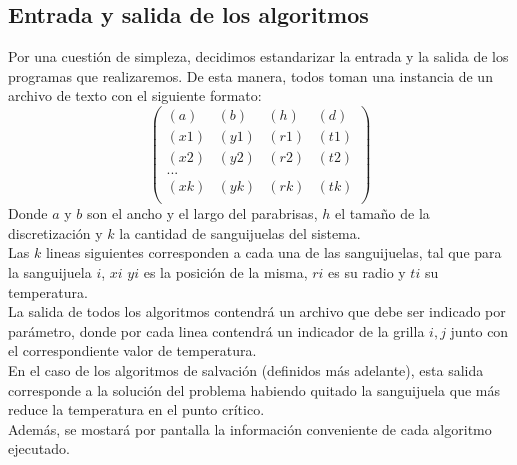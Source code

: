 \newpage
\subsection{Entrada y salida de los algoritmos}

Por una cuestión de simpleza, decidimos estandarizar la entrada y la salida de los programas que realizaremos. De esta manera, todos toman una instancia de un archivo de texto con el siguiente formato:
$$
\begin{pmatrix}
 (a) & (b) & (h) & (d) \\
 (x1) & (y1) & (r1) & (t1) \\
 (x2) & (y2) & (r2) & (t2) \\
...\\
 (xk) & (yk) & (rk) & (tk) \\
\end{pmatrix}
$$
Donde $a$ y $b$ son el ancho y el largo del parabrisas, $h$ el tamaño de la discretización y $k$ la cantidad de sanguijuelas del sistema.
\\
Las $k$ lineas siguientes corresponden a cada una de las sanguijuelas, tal que para la sanguijuela $i$, $xi$ $yi$ es la posición de la misma, $ri$ es su radio y $ti$ su temperatura.
\\
La salida de todos los algoritmos contendrá un archivo que debe ser indicado por parámetro, donde por cada linea contendrá un indicador de la grilla $i,j$ junto con el correspondiente valor de temperatura.
\\
En el caso de los algoritmos de salvación (definidos más adelante), esta salida corresponde a la solución del problema habiendo quitado la sanguijuela que más reduce la temperatura en el punto crítico.
\\
Además, se mostará por pantalla la información conveniente de cada algoritmo ejecutado.
